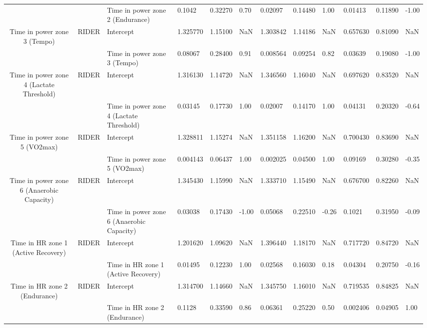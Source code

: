 \begin{tabular}{c}
                                      &       & Time in power zone 2 (Endurance) &    0.1042 &  0.32270 &  0.70 &   0.02097 &  0.14480 &  1.00 &   0.01413 &  0.11890 & -1.00 \\
Time in power zone 3 (Tempo) & RIDER & Intercept &  1.325770 &  1.15100 &   NaN &  1.303842 &  1.14186 &   NaN &  0.657630 &  0.81090 &   NaN \\
                                      &       & Time in power zone 3 (Tempo) &   0.08067 &  0.28400 &  0.91 &  0.008564 &  0.09254 &  0.82 &   0.03639 &  0.19080 & -1.00 \\
Time in power zone 4 (Lactate Threshold) & RIDER & Intercept &  1.316130 &  1.14720 &   NaN &  1.346560 &  1.16040 &   NaN &  0.697620 &  0.83520 &   NaN \\
                                      &       & Time in power zone 4 (Lactate Threshold) &   0.03145 &  0.17730 &  1.00 &   0.02007 &  0.14170 &  1.00 &   0.04131 &  0.20320 & -0.64 \\
Time in power zone 5 (VO2max) & RIDER & Intercept &  1.328811 &  1.15274 &   NaN &  1.351158 &  1.16200 &   NaN &  0.700430 &  0.83690 &   NaN \\
                                      &       & Time in power zone 5 (VO2max) &  0.004143 &  0.06437 &  1.00 &  0.002025 &  0.04500 &  1.00 &   0.09169 &  0.30280 & -0.35 \\
Time in power zone 6 (Anaerobic Capacity) & RIDER & Intercept &  1.345430 &  1.15990 &   NaN &  1.333710 &  1.15490 &   NaN &  0.676700 &  0.82260 &   NaN \\
                                      &       & Time in power zone 6 (Anaerobic Capacity) &   0.03038 &  0.17430 & -1.00 &   0.05068 &  0.22510 & -0.26 &    0.1021 &  0.31950 & -0.09 \\
Time in HR zone 1 (Active Recovery) & RIDER & Intercept &  1.201620 &  1.09620 &   NaN &  1.396440 &  1.18170 &   NaN &  0.717720 &  0.84720 &   NaN \\
                                      &       & Time in HR zone 1 (Active Recovery) &   0.01495 &  0.12230 &  1.00 &   0.02568 &  0.16030 &  0.18 &   0.04304 &  0.20750 & -0.16 \\
Time in HR zone 2 (Endurance) & RIDER & Intercept &  1.314700 &  1.14660 &   NaN &  1.345750 &  1.16010 &   NaN &  0.719535 &  0.84825 &   NaN \\
                                      &       & Time in HR zone 2 (Endurance) &    0.1128 &  0.33590 &  0.86 &   0.06361 &  0.25220 &  0.50 &  0.002406 &  0.04905 &  1.00 \\

\end{tabular}
